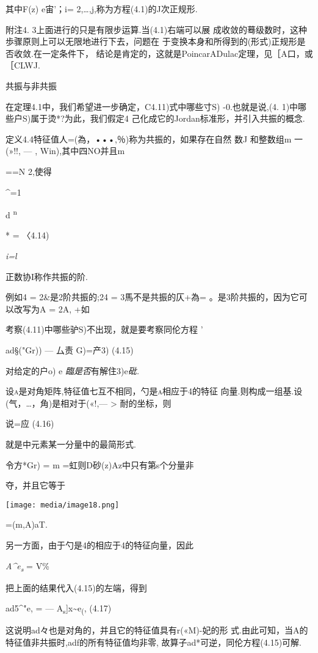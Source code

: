\documentclass{article}
\begin{document}
其中F(z) e宙'；i= 2,\ldots{},j,称为方程(4.1)的J次正规形.

附注4. 3上面进行的只是有限步运算.当(4.1)右端可以展
成收敛的蓦级数时，这种歩骤原则上可以无限地进行下去，问题在
于变换本身和所得到的(形式)正规形是否收敛.在一定条件下，
结论是肯定的，这就是PoincarADulac定理，见［A口，或［CLWJ.

共振与非共振

在定理4.1中，我们希望进一步确定，C4.11)式中哪些寸S) -0.也就是说,(4.
1)中哪些户S)属于烫*?为此，我们假定4
己化成它的Jordan标准形，并引入共振的概念.

定义4.4特征值人=(為，•••,％)称为共振的，如果存在自然 数J 和整数组m 一
(»!!, --- , Win),其中四NO并且\textbar{}m\textbar{}

==N 2,使得

\^{}=1

d \textsuperscript{n}

* = 〈4.14)

\emph{i=l}

正数协I称作共振的阶.

例如4 = 2\&是2阶共振的;24 = 3馬不是共振的仄+為=
。是3阶共振的，因为它可以改写为A = 2A, +如

考察(4.11)中哪些驴S)不出现，就是要考察同伦方程 '

ad§("Gr)) --- 厶责 G)=产3) (4.15)

对给定的户o) e \emph{臨是否}有解住3)e\emph{砒.}

设\textsc{a}是对角矩阵,特征值七互不相同，勺是\textsc{a}相应于4的特征
向量.则构成一组基.设(气，\ldots{}，角\textbar{})是相对于(«!,---
\textgreater{} 耐的坐标，则

\textbar{}说\textbar{}=应 (4.16)

就是中元素某一分量中的最简形式.

令方*Gr) = \textbar{}m \textbar{} =虹则D砂(z)Az中只有第s个分量非

夺，并且它等于

\texttt{[image: media/image18.png]}

=(m,A)aT.

另一方面，由于勺是4的相应于4的特征向量，因此

\emph{A\^{}e\textsubscript{s}} = V\%

把上面的结果代入(4.15)的左端，得到

ad5\^{}"e, = ---
A\textsubscript{s}{]}x\textasciitilde{}e\textsubscript{(}, (4.17)

这说明ad々也是对角的，并且它的特征值具有r(«M)-妃\textbar{}的形
式.由此可知，当A的特征值非共振时,adf的所有特征值均非零,
故算子ad*可逆，同伦方程(4.15)可解.
\end{document}
